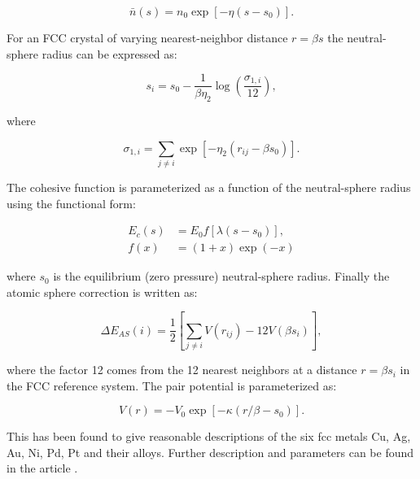 \begin{equation}
    \bar{n}(s) = n_0 \exp \left[ - \eta(s - s_0) \right] .
\end{equation}

For an FCC crystal of varying nearest-neighbor distance
$r = \beta s$ the neutral-sphere radius can be expressed as:

\begin{equation}
    s_i = s_0 - \frac{1}{\beta \eta_2} \log \left(
    \frac{\sigma_{1,i}}{12} \right) ,
\end{equation}

where

\begin{equation}
    \sigma_{1, i} = \sum_{j \neq i} \exp \left[ - \eta_2
    \left( r_{ij} - \beta s_0 \right) \right] .
\end{equation}

The cohesive function is parameterized as a function
of the neutral-sphere radius using the functional form:

\begin{equation}
    \begin{split}
        E_c (s) &= E_0 f\left[ \lambda \left( s - s_0 \right) \right], \\
        f\left( x \right) &= \left( 1 + x \right) \exp \left( - x \right)
    \end{split}
\end{equation}

where $s_0$ is the equilibrium (zero pressure) neutral-sphere radius.
Finally the atomic sphere correction is written as:

\begin{equation}
    \Delta E_{AS}(i) = \frac{1}{2} \left[ \sum_{j \neq i} V(r_{ij})
    - 12 V(\beta s_i) \right],
\end{equation}

where the factor 12 comes from the 12 nearest neighbors at
a distance $r = \beta s_i$ in the FCC reference system.
The pair potential is parameterized as:

\begin{equation}
    V(r) = - V_0 \exp \left[ - \kappa \left( r/\beta - s_0 \right) \right] .
\end{equation}

This has been found to give reasonable descriptions
of the six fcc metals Cu, Ag, Au, Ni, Pd, Pt and their alloys.
Further description and parameters can be found in the article
\parencite[Jacobsen, K.W.;
Stoltze, P. and Nørskov, J.K.]{jacobsen1996semi}.
